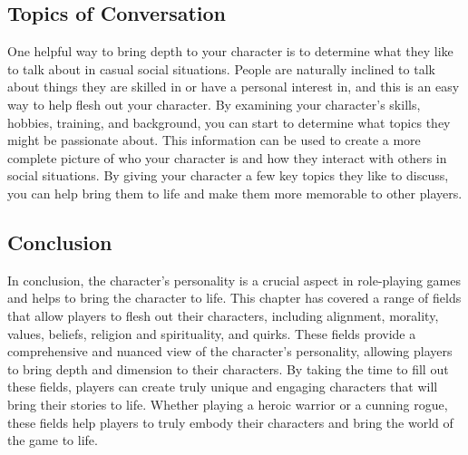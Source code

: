 \subsection{\textbf{Topics of Conversation}}

One helpful way to bring depth to your character is to determine what they like to talk about in casual social situations. People are naturally inclined to talk about things they are skilled in or have a personal interest in, and this is an easy way to help flesh out your character. By examining your character's skills, hobbies, training, and background, you can start to determine what topics they might be passionate about. This information can be used to create a more complete picture of who your character is and how they interact with others in social situations. By giving your character a few key topics they like to discuss, you can help bring them to life and make them more memorable to other players.

\subsection{\textbf{Conclusion}}

In conclusion, the character's personality is a crucial aspect in role-playing games and helps to bring the character to life. This chapter has covered a range of fields that allow players to flesh out their characters, including alignment, morality, values, beliefs, religion and spirituality, and quirks. These fields provide a comprehensive and nuanced view of the character's personality, allowing players to bring depth and dimension to their characters. By taking the time to fill out these fields, players can create truly unique and engaging characters that will bring their stories to life. Whether playing a heroic warrior or a cunning rogue, these fields help players to truly embody their characters and bring the world of the game to life.

